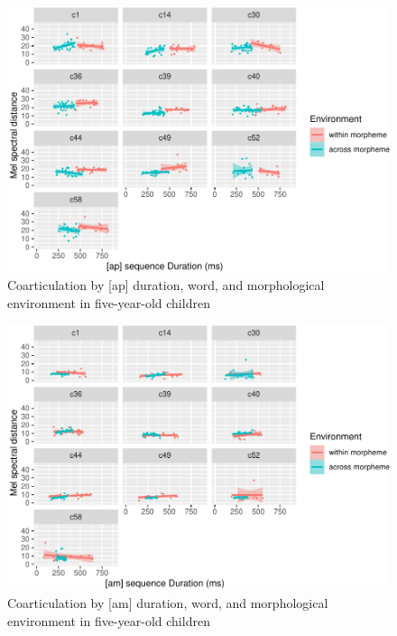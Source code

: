 \documentclass[
]{article}
\begin{document}
\begin{figure}
\centering
\includegraphics{3_ch3_results_files/figure-latex/five-facet-ap-1.pdf}
\caption{\label{fig:five-facet-ap}Coarticulation by {[}ap{]} duration, word, and morphological environment in five-year-old children}
\end{figure}

\begin{figure}
\centering
\includegraphics{3_ch3_results_files/figure-latex/five-facet-am-1.pdf}
\caption{\label{fig:five-facet-am}Coarticulation by {[}am{]} duration, word, and morphological environment in five-year-old children}
\end{figure}
\end{document}
